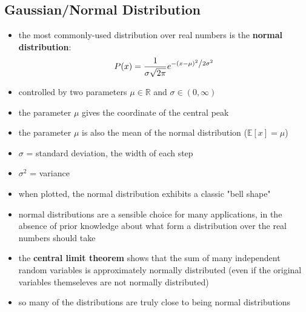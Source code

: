 \documentclass[11pt, twocolumn]{report}
\def\expectation{\mathbb{E}}
\begin{document}
\subsection{Gaussian/Normal Distribution}
\begin{itemize}
  \item the most commonly-used distribution over real numbers is the
    \textbf{normal distribution}:
    \begin{equation}
      P(x) = \frac{1}{{\sigma \sqrt {2\pi } }}e^{{{ - \left( {x - \mu } \right)^2 }
          \mathord{\left/ {\vphantom {{ - \left( {x - \mu } \right)^2 } {2\sigma ^2
                  }}} \right. \kern-\nulldelimiterspace} {2\sigma ^2 }}}
    \end{equation}
  \item controlled by two parameters $\mu \in \mathbb{R}$ and $\sigma \in (0,
    \infty)$
  \item the parameter $\mu$ gives the coordinate of the central peak
  \item the parameter $\mu$ is also the mean of the normal distribution
    ($\expectation{[x]} = \mu$)
  \item $\sigma$ = standard deviation, the width of each step
  \item $\sigma^2$ = variance
  \item when plotted, the normal distribution exhibits a classic "bell shape"
  \item normal distributions are a sensible choice for many applications, in the
    absence of prior knowledge about what form a distribution over the real
    numbers should take
  \item the \textbf{central limit theorem} shows that the sum of many
    independent random variables is approximately normally distributed (even if
    the original variables themseleves are not normally distributed)
  \item so many of the distributions are truly close to being normal
    distributions
\end{itemize}
\end{document}
